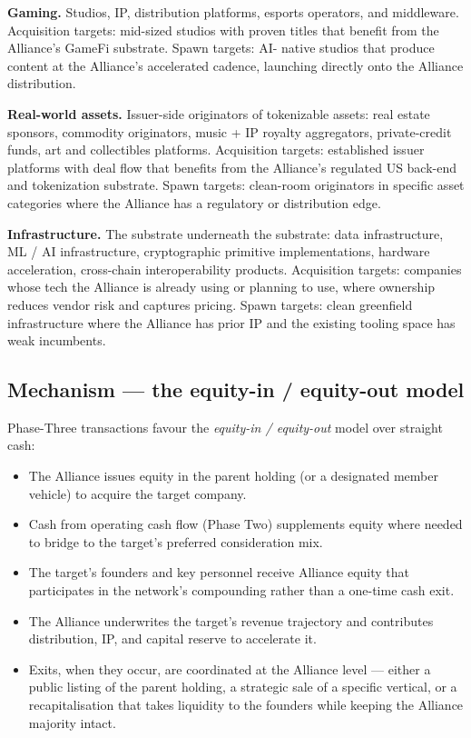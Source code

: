 \textbf{Gaming.} Studios, IP, distribution platforms, esports operators,
and middleware. Acquisition targets: mid-sized studios with proven titles
that benefit from the Alliance's GameFi substrate. Spawn targets: AI-
native studios that produce content at the Alliance's accelerated cadence,
launching directly onto the Alliance distribution.

\textbf{Real-world assets.} Issuer-side originators of tokenizable
assets: real estate sponsors, commodity originators, music + IP royalty
aggregators, private-credit funds, art and collectibles platforms.
Acquisition targets: established issuer platforms with deal flow that
benefits from the Alliance's regulated US back-end and tokenization
substrate. Spawn targets: clean-room originators in specific asset
categories where the Alliance has a regulatory or distribution edge.

\textbf{Infrastructure.} The substrate underneath the substrate: data
infrastructure, ML / AI infrastructure, cryptographic primitive
implementations, hardware acceleration, cross-chain interoperability
products. Acquisition targets: companies whose tech the Alliance is
already using or planning to use, where ownership reduces vendor risk
and captures pricing. Spawn targets: clean greenfield infrastructure
where the Alliance has prior IP and the existing tooling space has weak
incumbents.

\subsection{Mechanism --- the equity-in / equity-out model}

Phase-Three transactions favour the \emph{equity-in / equity-out} model
over straight cash:

\begin{itemize}[leftmargin=2em,itemsep=0.1em]
\item The Alliance issues equity in the parent holding (or a designated
member vehicle) to acquire the target company.
\item Cash from operating cash flow (Phase Two) supplements equity where
needed to bridge to the target's preferred consideration mix.
\item The target's founders and key personnel receive Alliance equity
that participates in the network's compounding rather than a one-time
cash exit.
\item The Alliance underwrites the target's revenue trajectory and
contributes distribution, IP, and capital reserve to accelerate it.
\item Exits, when they occur, are coordinated at the Alliance level ---
either a public listing of the parent holding, a strategic sale of a
specific vertical, or a recapitalisation that takes liquidity to the
founders while keeping the Alliance majority intact.
\end{itemize}

